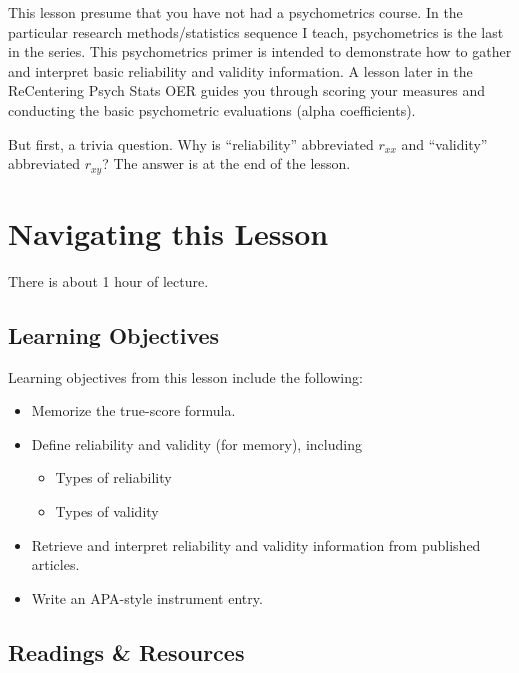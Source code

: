 \documentclass[
  english,
]{book}
\providecommand{\tightlist}{%
  \setlength{\itemsep}{0pt}\setlength{\parskip}{0pt}}
\begin{document}
This lesson presume that you have not had a psychometrics course. In the particular research methods/statistics sequence I teach, psychometrics is the last in the series. This psychometrics primer is intended to demonstrate how to gather and interpret basic reliability and validity information. A lesson later in the ReCentering Psych Stats OER guides you through scoring your measures and conducting the basic psychometric evaluations (alpha coefficients).

But first, a trivia question. Why is ``reliability'' abbreviated \(r_{xx}\) and ``validity'' abbreviated \(r_{xy}\)? The answer is at the end of the lesson.

\hypertarget{navigating-this-lesson-5}{%
\section{Navigating this Lesson}\label{navigating-this-lesson-5}}

There is about 1 hour of lecture.

\hypertarget{learning-objectives-5}{%
\subsection{Learning Objectives}\label{learning-objectives-5}}

Learning objectives from this lesson include the following:

\begin{itemize}
\tightlist
\item
  Memorize the true-score formula.
\item
  Define reliability and validity (for memory), including

  \begin{itemize}
  \tightlist
  \item
    Types of reliability
  \item
    Types of validity
  \end{itemize}
\item
  Retrieve and interpret reliability and validity information from published articles.
\item
  Write an APA-style instrument entry.
\end{itemize}

\hypertarget{readings-resources-5}{%
\subsection{Readings \& Resources}\label{readings-resources-5}}
\end{document}
